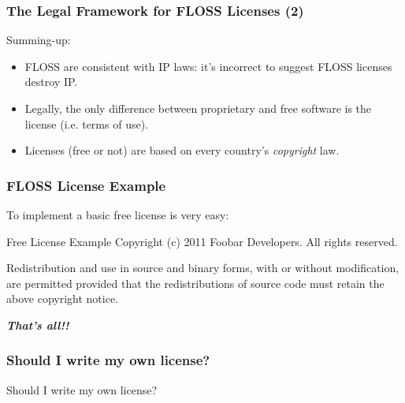 \begin{frame}
\frametitle{The Legal Framework for FLOSS Licenses (2)}

Summing-up:
\begin{itemize}
\item FLOSS are consistent with IP laws: it's incorrect to suggest FLOSS licenses destroy IP.
\item Legally, the only difference between proprietary and free software is the license (i.e. terms of use). 
\item Licenses (free or not) are based on every country's \textit{copyright} law.
\end{itemize}

\end{frame}



\begin{frame}
\frametitle{FLOSS License Example}

To implement a basic free license is very easy: 

\begin{block}{Free License Example}
Copyright (c) 2011 Foobar Developers. All rights reserved. 

\medskip
Redistribution and use in source and binary forms, with or without modification, are permitted provided that the redistributions of source code must retain the above copyright notice.
\end{block}

\pause
\medskip

\textbf{\textit{That's all!!}}

\end{frame}


\begin{frame}
\frametitle{Should I write my own license?}

\begin{center}
\Large Should I write my own license?
\end{center}

\end{frame}





